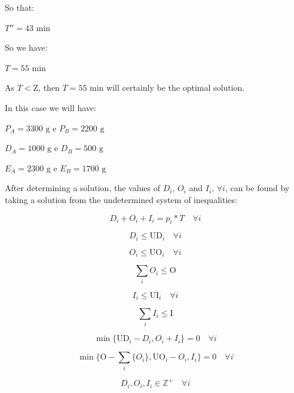 \documentclass[authoryear,manuscript,12pt]{elsarticle}
\begin{document}
So that:

$T'' = 43 \textrm{ min}$

So we have:

$T = 55 \textrm{ min}$

As $T<\textrm{Z}$, then $T = 55 \textrm{ min}$ will certainly be the optimal solution.

In this case we will have:

$P_A = 3300 \textrm{ g}$ e $P_B=2200 \textrm{ g}$

$D_A = 1000 \textrm{ g}$ e $D_B = 500 \textrm{ g}$

$E_A = 2300 \textrm{ g}$ e $E_B = 1700 \textrm{ g}$

After determining a solution, the values of $D_i$, $O_i$ and $I_i$, $\forall i$, can be found by taking a solution from the undetermined system of inequalities:

\begin{equation}
D_i + O_i + I_i = p_i*T \quad \forall i
\end{equation}

\begin{equation}
D_i \leq \textrm{UD}_i \quad \forall i
\end{equation}

\begin{equation}
O_i \leq \textrm{UO}_i \quad \forall i
\end{equation}

\begin{equation}
\label{eq:resO}
\sum_i{O_i} \leq \textrm{O}
\end{equation}

\begin{equation}
I_i \leq \textrm{UI}_i \quad \forall i
\end{equation}

\begin{equation}
\label{eq:resI}
\sum_i{I_i} \leq \textrm{I}
\end{equation}

\begin{equation}
\min \{\textrm{UD}_i - D_i, O_i + I_i\} = 0 \quad \forall i
\end{equation}

\begin{equation}
\min\{\textrm{O} - \sum_i\{ O_i\}, \textrm{UO}_i - O_i, I_i\} = 0 \quad \forall i
\end{equation}

\begin{equation}
D_i, O_i, I_i \in  \mathbb{Z}^+ \quad \forall i
\end{equation}
\end{document}
